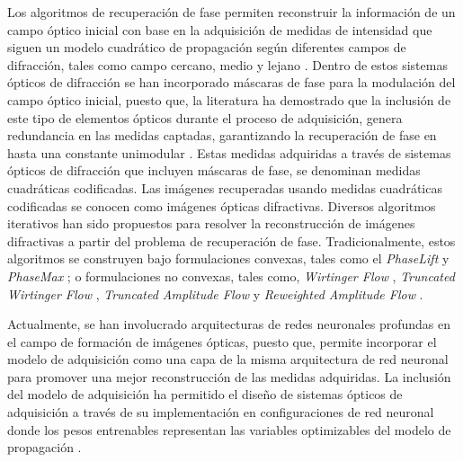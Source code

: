 Los algoritmos de recuperación de fase permiten reconstruir la información de un campo óptico inicial con base en la adquisición de medidas de intensidad que siguen un modelo cuadrático de propagación según diferentes campos de difracción, tales como campo cercano, medio y lejano . Dentro de estos sistemas ópticos de difracción se han incorporado máscaras de fase para la modulación del campo óptico inicial, puesto que, la literatura ha demostrado que la inclusión de este tipo de elementos ópticos durante el proceso de adquisición, genera redundancia en las medidas captadas, garantizando la recuperación de fase en hasta una constante unimodular . Estas medidas adquiridas a través de sistemas ópticos de difracción que incluyen máscaras de fase, se denominan medidas cuadráticas codificadas. Las imágenes recuperadas usando medidas cuadráticas codificadas se conocen como imágenes ópticas difractivas. Diversos algoritmos iterativos han sido propuestos para resolver la reconstrucción de imágenes difractivas a partir del problema de recuperación de fase. Tradicionalmente, estos algoritmos se construyen bajo formulaciones convexas, tales como el \textit{PhaseLift}  y \textit{PhaseMax} ; o formulaciones no convexas, tales como, \textit{Wirtinger Flow} , \textit{Truncated Wirtinger Flow} , \textit{Truncated Amplitude Flow}  y \textit{Reweighted Amplitude Flow} .  

Actualmente, se han involucrado arquitecturas de redes neuronales profundas en el campo de formación de imágenes ópticas, puesto que, permite incorporar el modelo de adquisición como una capa de la misma arquitectura de red neuronal para promover una mejor reconstrucción de las medidas adquiridas. La inclusión del modelo de adquisición ha permitido el diseño de sistemas ópticos de adquisición a través de su implementación en configuraciones de red neuronal donde los pesos entrenables representan las variables optimizables del modelo de propagación . 

